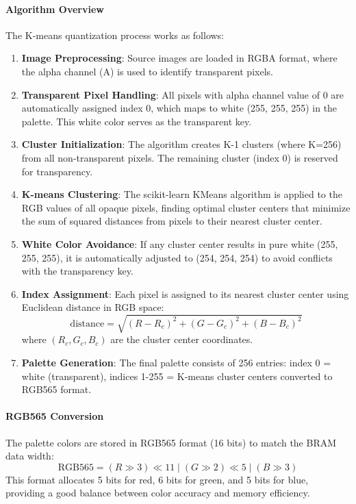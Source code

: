 \documentclass[12pt,a4paper]{article}
\begin{document}
\paragraph{Algorithm Overview}
The K-means quantization process works as follows:
\begin{enumerate}
    \item \textbf{Image Preprocessing}: Source images are loaded in RGBA format, where the alpha channel (A) is used to identify transparent pixels.
    \item \textbf{Transparent Pixel Handling}: All pixels with alpha channel value of 0 are automatically assigned index 0, which maps to white (255, 255, 255) in the palette. This white color serves as the transparent key.
    \item \textbf{Cluster Initialization}: The algorithm creates K-1 clusters (where K=256) from all non-transparent pixels. The remaining cluster (index 0) is reserved for transparency.
    \item \textbf{K-means Clustering}: The scikit-learn KMeans algorithm is applied to the RGB values of all opaque pixels, finding optimal cluster centers that minimize the sum of squared distances from pixels to their nearest cluster center.
    \item \textbf{White Color Avoidance}: If any cluster center results in pure white (255, 255, 255), it is automatically adjusted to (254, 254, 254) to avoid conflicts with the transparency key.
    \item \textbf{Index Assignment}: Each pixel is assigned to its nearest cluster center using Euclidean distance in RGB space:
    \begin{equation}
    \text{distance} = \sqrt{(R - R_c)^2 + (G - G_c)^2 + (B - B_c)^2}
    \end{equation}
    where $(R_c, G_c, B_c)$ are the cluster center coordinates.
    \item \textbf{Palette Generation}: The final palette consists of 256 entries: index 0 = white (transparent), indices 1-255 = K-means cluster centers converted to RGB565 format.
\end{enumerate}

\paragraph{RGB565 Conversion}
The palette colors are stored in RGB565 format (16 bits) to match the BRAM data width:
\begin{equation}
\text{RGB565} = (R \gg 3) \ll 11 \mid (G \gg 2) \ll 5 \mid (B \gg 3)
\end{equation}
This format allocates 5 bits for red, 6 bits for green, and 5 bits for blue, providing a good balance between color accuracy and memory efficiency.
\end{document}
